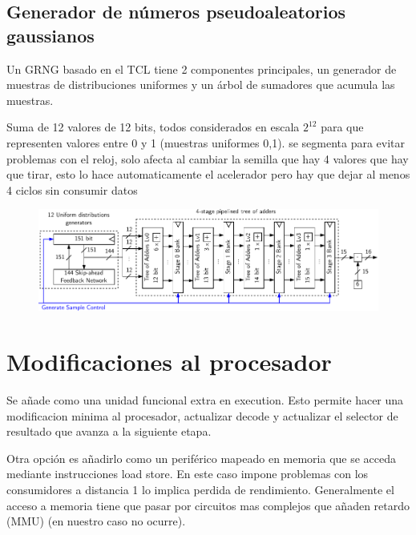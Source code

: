 \subsection{Generador de números pseudoaleatorios gaussianos}

Un GRNG basado en el TCL tiene 2 componentes principales, un generador de muestras de distribuciones uniformes y un árbol de sumadores que acumula las muestras.

\todo Suma de 12 valores de 12 bits, todos considerados en escala $2^{12}$ para que representen valores entre 0 y 1 (muestras uniformes 0,1). se segmenta para evitar problemas con el reloj, solo afecta al cambiar la semilla que hay 4 valores que hay que tirar, esto lo hace automaticamente el acelerador pero hay que dejar al menos 4 ciclos sin consumir datos

\begin{figure}[h]
    \centering
    \includegraphics[width=\textwidth]{Imagenes/grng.pdf}
    \caption{\todo}
    \label{fig:aa}
\end{figure}

\section{Modificaciones al procesador}

Se añade como una unidad funcional extra en execution. Esto permite hacer una modificacion minima al procesador, actualizar decode y actualizar el selector de resultado que avanza a la siguiente etapa.

Otra opción es añadirlo como un periférico mapeado en memoria que se acceda mediante instrucciones load store. En este caso impone problemas con los consumidores a distancia 1 lo implica perdida de rendimiento. Generalmente el acceso a memoria tiene que pasar por circuitos mas complejos que añaden retardo (MMU) (en nuestro caso no ocurre).

